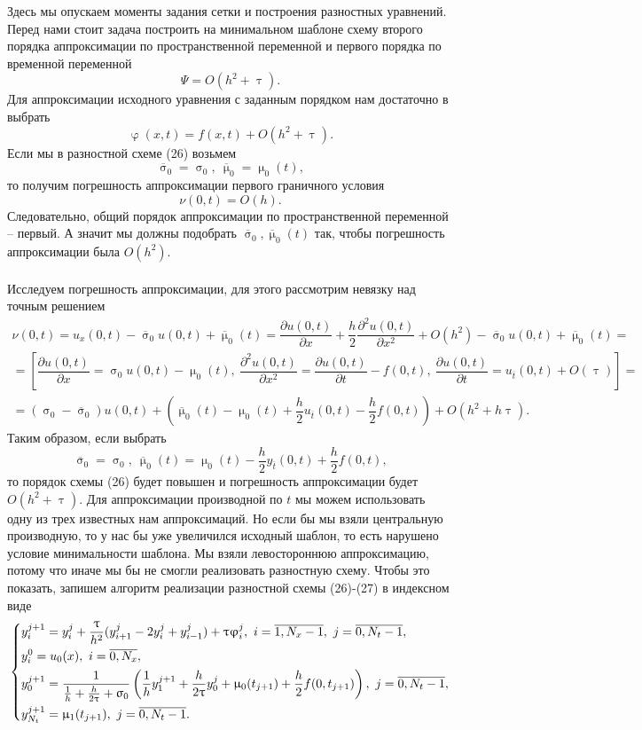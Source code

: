 \documentclass[a4paper, 12pt]{report}
\numberwithin{equation}{section}
\newcommand{\ol}{\overline}
\renewcommand{\varphi}{\upvarphi}
\renewcommand{\tau}{\uptau}
\renewcommand{\sigma}{\upsigma}
\renewcommand{\mu}{\upmu}
\renewcommand{\d}{\partial}
\begin{document}
Здесь мы опускаем моменты задания сетки и построения разностных уравнений. Перед нами стоит задача построить на минимальном шаблоне схему второго порядка аппроксимации по пространственной переменной и первого порядка по временной переменной $$\Psi = O(h^2+\tau).$$
Для аппроксимации исходного уравнения с заданным порядком нам достаточно в выбрать $$\varphi(x,t) = f(x,t) + O(h^2 + \tau).$$
Если мы в разностной схеме (26) возьмем $$\ol \sigma_0=\sigma_0,\ \ol \mu_0 = \mu_0(t),$$
то получим погрешность аппроксимации первого граничного условия
$$\nu(0,t) = O(h).$$
Следовательно, общий порядок аппроксимации по пространственной переменной -- первый. А значит мы должны подобрать $\ol \sigma_0, \ol \mu_0(t)$ так, чтобы погрешность аппроксимации была $O(h^2)$. \\\\
Исследуем погрешность аппроксимации, для этого рассмотрим невязку над точным решением
\begin{multline*}
	\nu(0,t) = u_x(0,t) - \ol \sigma_0 u(0,t) + \ol \mu_0(t) = \dfrac{\d u(0,t)}{\d x} + \dfrac h2 \dfrac{\d ^2 u(0,t)}{\d x^2} + O(h^2) - \ol \sigma_0 u(0,t) + \ol \mu_0(t) =\\=\left[\dfrac{\d u(0,t)}{\d x} = \sigma_0 u(0,t) - \mu_0(t),\ \dfrac{\d ^2 u(0,t)}{\d x^2}  = \dfrac{\d u (0,t)}{\d t} - f(0,t),\  \dfrac{\d u (0,t)}{\d t} = u_{\ol t}(0,t) + O(\tau)\right]=\\= (\sigma_0 - \ol \sigma_0) u(0,t) + \left(\ol \mu_0(t) - \mu_0(t) + \dfrac{h}{2} u_{\ol t}(0,t) - \dfrac h2 f(0,t)\right) + O(h^2 + h\tau).
\end{multline*}
Таким образом, если выбрать 
\begin{equation}
	\ol \sigma_0 = \sigma_0,\ \ol \mu_0(t) = \mu_0(t) - \dfrac h2 y_{\ol t}(0,t) + \dfrac h2 f(0,t),
\end{equation}
то порядок схемы (26) будет повышен и погрешность аппроксимации будет $O(h^2 + \tau).$ Для аппроксимации производной по $t$ мы можем использовать одну из трех известных нам аппроксимаций. Но если бы мы взяли центральную производную, то у нас бы уже увеличился исходный шаблон, то есть нарушено условие минимальности шаблона. Мы взяли левостороннюю аппроксимацию, потому что иначе мы бы не смогли реализовать разностную схему. Чтобы это показать, запишем алгоритм реализации разностной схемы (26)-(27) в индексном виде
\begin{equation}
	\begin{dcases}
		y_{i}^{j+1} = y_i^j + \dfrac{\tau}{h^2} (y_{i+1}^j - 2y_i^j + y_{i-1}^j) + \tau \varphi_i^j,\ i = \overline {1, N_x - 1},\ j = \overline {0, N_t -1},\\
		y_i^0 = u_0(x),\ i = \overline {0, N_x},\\
		y_0^{j+1} = \dfrac{1}{\frac 1h + \frac{h}{2\tau} + \sigma_0}\left(\dfrac 1h y_1^{j+1} + \dfrac{h}{2\tau}y_0^{j} + \mu_0(t_{j+1}) + \dfrac h2 f(0, t_{j+1})\right),\ j = \overline{0, N_t - 1},\\
		y_{N_t}^{j+1} = \mu_1(t_{j+1}),\ j = \overline{0, N_t - 1}.
	\end{dcases}
\end{equation}
\end{document}
